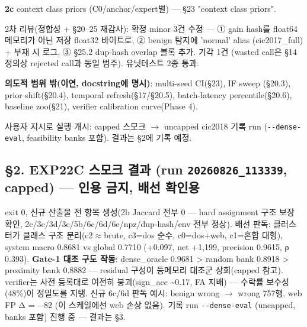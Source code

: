 \par\noindent \textbullet\enspace \textbf{2c} context class priors (C0/\allowbreak{}anchor/\allowbreak{}expert별) — §23 "context class priors".


2차 리뷰(정합성 +\allowbreak{} §20–25 재감사): 확정 minor 3건 수정 — ① gain hash를 float64 메모리가 아닌 저장 float32 바이트로, ② benign 탐지에 'normal' alias (cic2017\_\allowbreak{}full) +\allowbreak{} 부재 시 로그, ③ §25.2 dup-hash overlap 블록 추가. 기각 1건 (wasted call은 §14 정의상 rejected call과 동일 범주). 유닛테스트 2종 통과.

\textbf{의도적 범위 밖(이연, docstring에 명시)}: multi-seed CI(§23), IF sweep (§20.3), prior shift(§20.4), temporal refresh(§17/\allowbreak{}§20.5), batch-latency percentile(§20.6), baseline zoo(§21), verifier calibration curve(Phase 4).

사용자 지시로 실행 개시: capped 스모크  \ensuremath{\rightarrow}  uncapped cic2018 기록 run (\texttt{-\allowbreak{}-\allowbreak{}dense-\allowbreak{}eval}, feasibility banks 포함). 결과는 §2에 기록 예정.

\subsection{§2. EXP22C 스모크 결과 (run \texttt{20260826\allowbreak{}\_\allowbreak{}\allowbreak{}113339}, capped) — 인용 금지, 배선 확인용}
exit 0, 신규 산출물 전 항목 생성(2b Jaccard 전부 0 — hard assignment 구조 보장 확인, 2c/\allowbreak{}3c/\allowbreak{}3d/\allowbreak{}3e/\allowbreak{}5b/\allowbreak{}6c/\allowbreak{}6d/\allowbreak{}6e/\allowbreak{}npz/\allowbreak{}dup-hash/\allowbreak{}env 전부 정상). 배선 판독: 클러스터가 클래스 구조 분리(c2\ensuremath{\approx}brute, c3=\allowbreak{}dos 순수, c0=\allowbreak{}dos+\allowbreak{}web, c1=\allowbreak{}혼합 대형), system macro 0.8681 vs global 0.7710 (+\allowbreak{}0.097, net +\allowbreak{}1,199, precision 0.9615, ρ 0.393). \textbf{Gate-1 대조 구도 작동}: dense\_\allowbreak{}oracle 0.9681 > random bank 0.8918 > proximity bank 0.8882 — residual 구성이 등메모리 대조군 상회(capped 참고). verifier는 사전 등록대로 여전히 붕괴(sign\_\allowbreak{}acc \textasciitilde{}0.17, FA 지배) — 수락률 보수성 (48\%)이 정밀도를 지탱. 신규 6c/\allowbreak{}6d 판독 예시: benign wrong \ensuremath{\rightarrow} wrong 757행, web FP Δ =\allowbreak{} −82 (이 스케일에선 web 손상 없음). 기록 run \texttt{-\allowbreak{}-\allowbreak{}dense-\allowbreak{}eval} (uncapped, banks 포함) 진행 중 — 결과는 §3.

